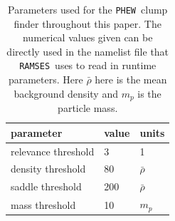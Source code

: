 \documentclass[a4paper,twocolumn,fleqn,usenatbib]{mnras}
\newcommand{\ramses}{\texttt{RAMSES}}
\newcommand{\phew}{\texttt{PHEW}}
\begin{document}
\begin{table}
\centering
\caption{Parameters used for the \phew\ clump finder throughout this
  paper.  The numerical values given can be directly used in the
  namelist file that \ramses\ uses to read in runtime parameters.
  Here $\bar \rho$ here is the mean background density and $m_p$ is
  the particle mass.}
\label{tab:phew-parameters}
\begin{tabular}[c]{l l l}
  parameter				&	value		& units \\
  \hline
  relevance threshold			&	3		& 1		\\
  density threshold			& 80			& $\bar \rho$ 	\\
  saddle threshold			& 200			& $\bar \rho$	\\
  mass threshold			& 10			& $m_p$		\\
  \hline
\end{tabular}
\end{table}


\end{document}
